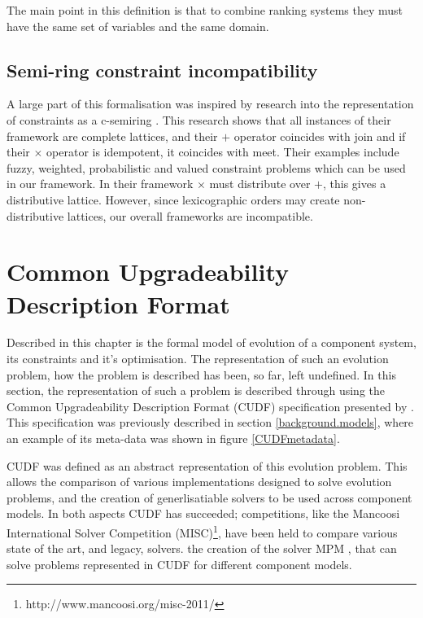 The main point in this definition is that to combine ranking systems they must have the same set of variables and the same domain.

\subsection{Semi-ring constraint incompatibility}
A large part of this formalisation was inspired by research into the representation of constraints as a c-semiring \cite{Bistarelli1997}.
This research shows that all instances of their framework are complete lattices, and their $+$ operator coincides with join
and if their $\times$ operator is idempotent, it coincides with meet.
Their examples include fuzzy, weighted, probabilistic and valued constraint problems which can be used in our framework.
In their framework $\times$ must distribute over $+$, this gives a distributive lattice.
However, since lexicographic orders may create non-distributive lattices, our overall frameworks are incompatible.

\section{Common Upgradeability Description Format}
\label{formal.cudf}
Described in this chapter is the formal model of evolution of a component system, its constraints and it's optimisation.
The representation of such an evolution problem, how the problem is described has been, so far, left undefined.
In this section, the representation of such a problem is described through using the Common Upgradeability Description Format (CUDF) specification presented by \cite{treinen2009common}.
This specification was previously described in section \ref{background.models}, where an example of its meta-data was shown in figure \ref{CUDFmetadata}.

CUDF was defined as an abstract representation of this evolution problem.
This allows the comparison of various implementations designed to solve evolution problems, and the creation of generlisatiable solvers to be used across component models.
In both aspects CUDF has succeeded;
competitions, like the Mancoosi International Solver Competition (MISC)\footnote{http://www.mancoosi.org/misc-2011/}, have been held to compare various state of the art, and legacy, solvers.
the creation of the solver MPM \cite{abate2011}, that can solve problems represented in CUDF for different component models.

